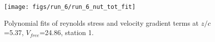 \begin{figure}[H]
\centering
\texttt{[image: figs/run\_6/run\_6\_nut\_tot\_fit]}
\caption{Polynomial fits of reynolds stress and velocity gradient terms at $z/c$=5.37, $V_{free}$=24.86, station 1.}
\label{fig:run_6_nut_tot_fit}
\end{figure}


